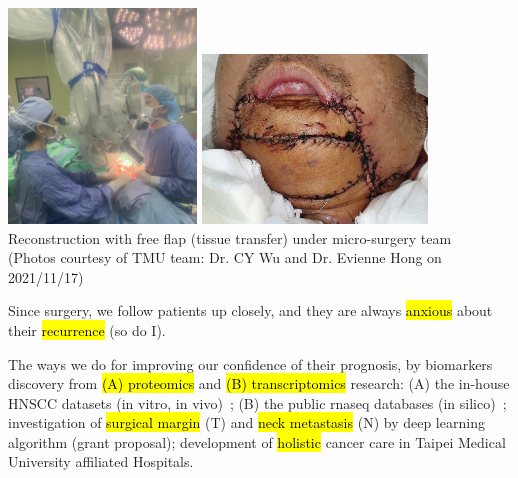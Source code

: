 \documentclass[
paper=landscape,
paper=160mm:90mm, %
fontsize=11pt, %
pagesize, %
parskip=half-, %
]{scrartcl} %
\theoremstyle{mythmstyle} %
\begin{document}
\includegraphics[width=5cm]{IMG_6791.jpg}
\includegraphics[width=6cm]{IMG_6910.jpg}\\
\large Reconstruction with free flap (tissue transfer) under micro-surgery team\\
{\tiny (Photos courtesy of TMU team: Dr. CY Wu and Dr. Evienne Hong on 2021/11/17)}

\clearpage
\thispagestyle{headings}

\large Since surgery, we follow patients up closely, and they are always \hl{anxious} about their \hl{recurrence} (so do I).\vspace{5mm}

\begin{outline}
\0 The ways we do for improving our confidence of their prognosis, by
\1 biomarkers discovery from \hl{(A) proteomics} and \hl{(B) transcriptomics} research:
    \2 (A) the in-house HNSCC datasets (in vitro, in vivo)~\parencite{Chi2017};
    \2 (B) the public \acrfull{rnaseq} databases (in silico)~\autocite{Chi2021};
\1 investigation of \hl{surgical margin} (T) and \hl{neck metastasis} (N) by deep learning algorithm (grant proposal);
\1 development of \hl{holistic} cancer care in Taipei Medical University affiliated Hospitals.

\end{outline}
\clearpage
\end{document}
